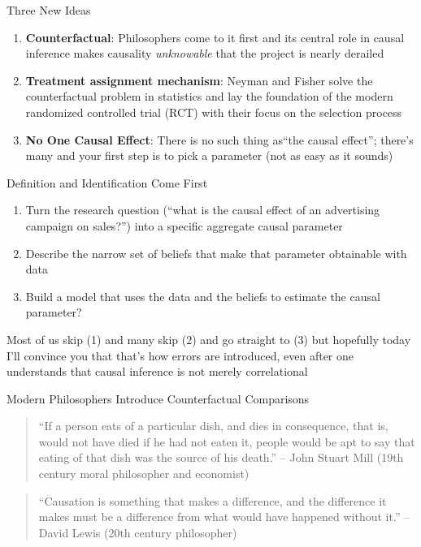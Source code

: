 \documentclass{beamer}
\begin{document}
\begin{frame}{Three New Ideas}

\begin{enumerate}
\item \textbf{Counterfactual}: Philosophers come to it first and its central role in causal inference makes causality \emph{unknowable} that the project is nearly derailed
\item \textbf{Treatment assignment mechanism}: Neyman and Fisher solve the counterfactual problem in statistics and lay the foundation of the modern randomized controlled trial (RCT) with their focus on the selection process
\item \textbf{No One Causal Effect}: There is no such thing as``the causal effect''; there's many and your first step is to pick a parameter (not as easy as it sounds)
\end{enumerate}


\end{frame}


\begin{frame}{Definition and Identification Come First}

\begin{enumerate}
\item Turn the research question (``what is the causal effect of an advertising campaign on sales?'') into a specific aggregate causal parameter
\item Describe the narrow set of beliefs that make that parameter obtainable with data
\item Build a model that uses the data and the beliefs to estimate the causal parameter?
\end{enumerate}

\bigskip

Most of us skip (1) and many skip (2) and go straight to (3) but hopefully today I'll convince you that that's how errors are introduced, even after one understands that causal inference is not merely correlational

\end{frame}




\begin{frame}{Modern Philosophers Introduce Counterfactual Comparisons}

\begin{quote}
    ``If a person eats of a particular dish, and dies in consequence, that is, would not have died if he had not eaten it, people would be apt to say that eating of that dish was the source of his death.'' -- John Stuart Mill (19th century moral philosopher and economist)
\end{quote}

\bigskip
  
    \begin{quote}
    ``Causation is something that makes a difference, and the difference it makes must be a difference from what would have happened without it.'' -- David Lewis (20th century philosopher)
\end{quote}

\end{frame}
\end{document}
